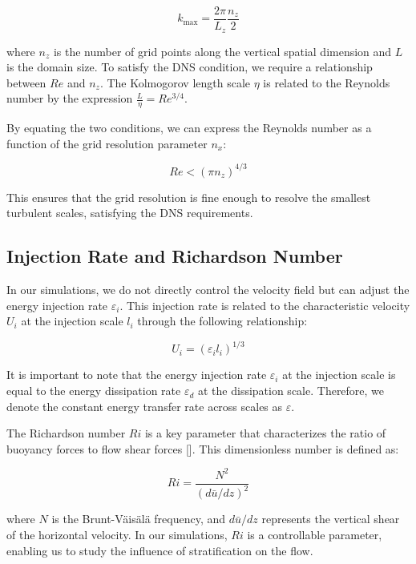 \documentclass[final,5p,times,twocolumn,authoryear]{elsarticle}
\begin{document}
\begin{equation*}
k_{\text{max}} = \frac{2\pi}{L_z} \frac{n_z}{2}
\end{equation*}

where $n_z$ is the number of grid points along the vertical spatial dimension and $L$ is the domain size. To satisfy the DNS condition, we require a relationship between $Re$ and $n_z$. The Kolmogorov length scale $\eta$ is related to the Reynolds number by the expression $\frac{L}{\eta} = Re^{3/4}$.

By equating the two conditions, we can express the Reynolds number as a function of the grid resolution parameter $n_x$:

\begin{equation}
Re < \left( \pi n_z \right)^{4/3}
\end{equation}

This ensures that the grid resolution is fine enough to resolve the smallest turbulent scales, satisfying the DNS requirements.

\subsection{Injection Rate and Richardson Number}

In our simulations, we do not directly control the velocity field but can adjust the energy injection rate $\varepsilon_i$. This injection rate is related to the characteristic velocity $U_i$ at the injection scale $l_i$ through the following relationship:

\begin{equation*}
U_i = (\varepsilon_i l_i)^{1/3}
\end{equation*}

It is important to note that the energy injection rate $\varepsilon_i$ at the injection scale is equal to the energy dissipation rate $\varepsilon_d$ at the dissipation scale. Therefore, we denote the constant energy transfer rate across scales as $\varepsilon$.

The Richardson number $Ri$ is a key parameter that characterizes the ratio of buoyancy forces to flow shear forces [\cite{cushman-roisin_introduction_2011}]. This dimensionless number is defined as:

\begin{equation}
Ri = \frac{N^2}{\left(d \bar{u} / dz \right)^2}
\end{equation}

where $N$ is the Brunt-Väisälä frequency, and $d\bar{u}/dz$ represents the vertical shear of the horizontal velocity. In our simulations, $Ri$ is a controllable parameter, enabling us to study the influence of stratification on the flow.
\end{document}
